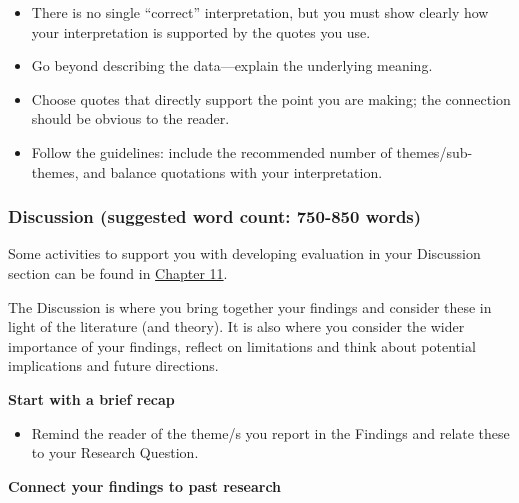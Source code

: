 \documentclass[
  english,
  letterpaper,
  DIV=11,
  numbers=noendperiod]{scrreprt}
\providecommand{\tightlist}{%
  \setlength{\itemsep}{0pt}\setlength{\parskip}{0pt}}
\begin{document}
\begin{tcolorbox}[enhanced jigsaw, breakable, bottomtitle=1mm, leftrule=.75mm, opacityback=0, colbacktitle=quarto-callout-warning-color!10!white, opacitybacktitle=0.6, toprule=.15mm, colback=white, left=2mm, coltitle=black, bottomrule=.15mm, titlerule=0mm, title={Tips}, toptitle=1mm, colframe=quarto-callout-warning-color-frame, arc=.35mm, rightrule=.15mm]

\begin{itemize}
\tightlist
\item
  There is no single ``correct'' interpretation, but you must show
  clearly how your interpretation is supported by the quotes you use.
\item
  Go beyond describing the data---explain the underlying meaning.
\item
  Choose quotes that directly support the point you are making; the
  connection should be obvious to the reader.
\item
  Follow the guidelines: include the recommended number of
  themes/sub-themes, and balance quotations with your interpretation.
\end{itemize}

\end{tcolorbox}

\subsubsection{Discussion (suggested word count: 750-850
words)}\label{discussion-suggested-word-count-750-850-words}

Some activities to support you with developing evaluation in your
Discussion section can be found in \hyperref[eval_discussion]{Chapter
11}.

The Discussion is where you bring together your findings and consider
these in light of the literature (and theory). It is also where you
consider the wider importance of your findings, reflect on limitations
and think about potential implications and future directions.

\textbf{Start with a brief recap}

\begin{itemize}
\tightlist
\item
  Remind the reader of the theme/s you report in the Findings and relate
  these to your Research Question.
\end{itemize}

\textbf{Connect your findings to past research}
\end{document}
